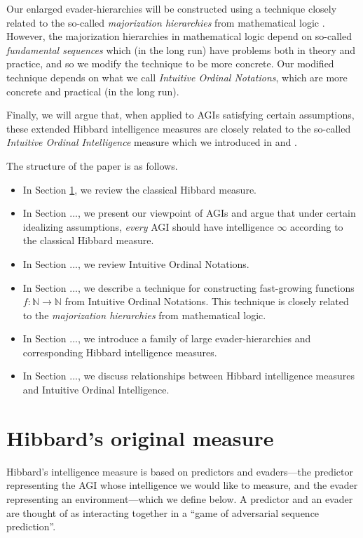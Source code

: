 \documentclass{article}
\begin{document}
Our enlarged evader-hierarchies will be constructed using a technique
closely related to the so-called
\emph{majorization hierarchies} from mathematical logic \cite{weiermann2002slow}.
However, the majorization hierarchies in mathematical logic depend on so-called
\emph{fundamental sequences} which (in the long run) have problems both in
theory and practice, and so we modify the technique to be more concrete. Our modified
technique depends on what we call \emph{Intuitive Ordinal Notations}, which are more
concrete and practical (in the long run).

Finally, we will argue that, when applied to AGIs satisfying certain assumptions,
these extended Hibbard intelligence measures
are closely related to the so-called \emph{Intuitive Ordinal Intelligence} measure
which we introduced in \cite{ioi1} and \cite{ioi2}.

The structure of the paper is as follows.
\begin{itemize}
    \item
    In Section \ref{originalmeasuresection}, we review the classical Hibbard measure.
    \item
    In Section ..., we present our viewpoint of AGIs and argue that
    under certain idealizing assumptions, \emph{every} AGI should have intelligence
    $\infty$ according to the classical Hibbard measure.
    \item
    In Section ..., we review Intuitive Ordinal Notations.
    \item
    In Section ..., we describe a technique for constructing fast-growing functions
    $f:\mathbb N\to\mathbb N$ from Intuitive Ordinal Notations. This technique is
    closely related to the \emph{majorization hierarchies} from mathematical logic.
    \item
    In Section ..., we introduce a family of large evader-hierarchies and corresponding
    Hibbard intelligence measures.
    \item
    In Section ..., we discuss relationships between Hibbard intelligence measures
    and Intuitive Ordinal Intelligence.
\end{itemize}

\section{Hibbard's original measure}
\label{originalmeasuresection}

Hibbard's intelligence measure is based on predictors and evaders---the predictor
representing the AGI whose intelligence we would like to measure, and the evader
representing an environment---which we define below. A predictor and an evader
are thought of as interacting together in a ``game of adversarial sequence prediction''.
\end{document}
